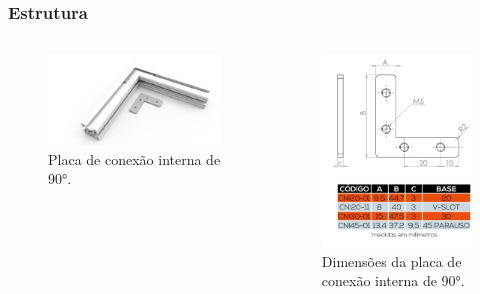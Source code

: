 \begin{frame}
\frametitle{Estrutura}
\begin{columns}
    \begin{figure}
        \centering
        \includegraphics[scale = 0.15]{figuras/pconexao90p}
        \caption{Placa de conexão interna de 90°.}
    \end{figure}        
    \begin{figure}
        \centering
        \includegraphics[scale = 0.10]{figuras/pconexao90d}
        \caption{Dimensões da placa de conexão interna de 90°.}
    \end{figure}        
\end{columns}    
\end{frame}

